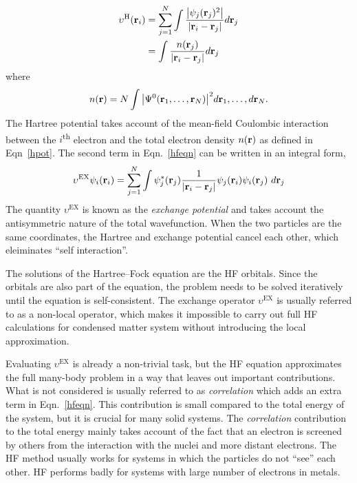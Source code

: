 \begin{align}\label{hpot}
\begin{split}
	\upsilon^{\text{H}}(\vb{r}_i) & = \sum_{j=1}^N \int\frac{\abs{\psi_j(\vb{r}_j)^2}}{\abs{\vb{r}_i - \vb{r}_j}} d\vb{r}_j \\
     & = \int \frac{n(\vb{r}_j)}{\abs{\vb{r}_i - \vb{r}_j}} d\vb{r}_j
\end{split}
\end{align}
where
\begin{equation}\label{density}
    n(\vb{r}) = N \int  \abs{\Psi^0(\vb{r}_1,\dots,\vb{r}_N)}^2 d\vb{r}_1,\dots,d\vb{r}_N.
\end{equation}
The Hartree potential takes account of the mean-field Coulombic interaction between the $i$\textsuperscript{th} electron and the total electron density $n(\vb{r})$ as defined in Eqn~\eqref{hpot}. The second term in Eqn.~\eqref{hfeqn} can be written in an integral form,
\begin{equation}\label{exeqn}
\upsilon^{\text{EX}}\psi_i(\vb{r}_i) = \sum_{j=1}^N \int \psi^{\ast}_j(\vb{r}_j)\frac{1}{\abs{\vb{r}_i - \vb{r}_j}}\psi_j(\vb{r}_i)\psi_i(\vb{r}_j)\ d\vb{r}_j
\end{equation}
The quantity $\upsilon^{\text{EX}}$ is known as the \textit{exchange potential} and takes account the antisymmetric nature of the total wavefunction. When the two particles are the same coordinates, the Hartree and exchange potential cancel each other, which eleiminates ``self interaction''.

The solutions of the Hartree--Fock equation are the HF orbitals. Since the orbitals are also part of the equation, the problem needs to be solved iteratively until the equation is self-consistent. The exchange operator $\upsilon^{\text{EX}}$ is usually referred to as a non-local operator, which makes it impossible to carry out full HF calculations for condensed matter system without introducing the local approximation. 

Evaluating $\upsilon^{\text{EX}}$ is already a non-trivial task, but the HF equation approximates the full many-body problem in a way that leaves out important contributions. What is not considered is usually referred to as \textit{correlation} which adds an extra term in Eqn.~\eqref{hfeqn}. This contribution is small compared to the total energy of the system, but it is crucial for many solid systems. The \textit{correlation} contribution to the total energy mainly takes account of the fact that an electron is screened by others from the interaction with the nuclei and more distant electrons. The HF method usually works for systems in which the particles do not ``see'' each other. HF performs badly for systems with large number of electrons in metals.


